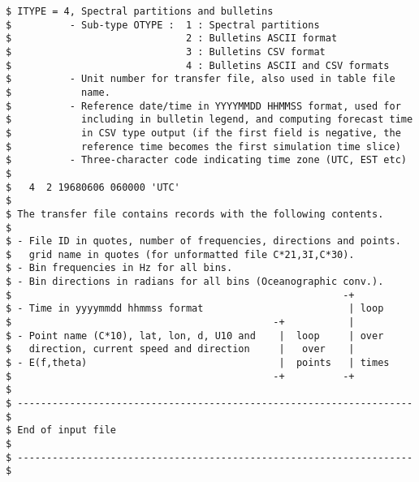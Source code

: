 \begin{footnotesize}
\begin{verbatim}
$ ITYPE = 4, Spectral partitions and bulletins
$          - Sub-type OTYPE :  1 : Spectral partitions
$                              2 : Bulletins ASCII format
$                              3 : Bulletins CSV format
$                              4 : Bulletins ASCII and CSV formats
$          - Unit number for transfer file, also used in table file
$            name.
$          - Reference date/time in YYYYMMDD HHMMSS format, used for 
$            including in bulletin legend, and computing forecast time
$            in CSV type output (if the first field is negative, the 
$            reference time becomes the first simulation time slice)
$          - Three-character code indicating time zone (UTC, EST etc)
$
$   4  2 19680606 060000 'UTC'
$
$ The transfer file contains records with the following contents.
$
$ - File ID in quotes, number of frequencies, directions and points.
$   grid name in quotes (for unformatted file C*21,3I,C*30).
$ - Bin frequencies in Hz for all bins.
$ - Bin directions in radians for all bins (Oceanographic conv.).
$                                                         -+
$ - Time in yyyymmdd hhmmss format                         | loop
$                                             -+           |
$ - Point name (C*10), lat, lon, d, U10 and    |  loop     | over
$   direction, current speed and direction     |   over    |
$ - E(f,theta)                                 |  points   | times
$                                             -+          -+
$ 
$ -------------------------------------------------------------------- $
$ End of input file                                                    $
$ -------------------------------------------------------------------- $
\end{verbatim}
\end{footnotesize}
